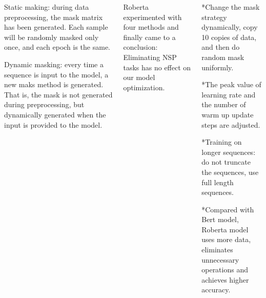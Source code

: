 \documentclass{tikzposter} %
\begin{document}
\begin{columns}
{}

{
\begin{description}

  	\item
    Static making: during data preprocessing, the mask matrix has been generated.
    Each sample will be randomly masked only once, and each epoch is the same.

    \item
    Dynamic masking: every time a sequence is input to the model,
    a new maks method is generated. That is, the mask is not generated
    during preprocessing, but dynamically generated when the input is provided
    to the model.
\end{description}
}


{
\begin{description}
  	\item
    Roberta experimented with four methods and finally came to a conclusion:
    Eliminating NSP tasks has no effect on our model optimization.
\end{description}
}

{
\begin{description}
  	
  \item
  *Change the mask strategy dynamically, copy 10 copies of data, and
  then do random mask uniformly.
  \item
  *The peak value of learning rate and the number of warm up
  update steps are adjusted.
  \item
  *Training on longer sequences: do not truncate the sequences,
  use full length sequences.
  \item
  *Compared with Bert model, Roberta model uses more data, eliminates 
  unnecessary operations and achieves higher accuracy.
\end{description}
}









\end{columns}
\end{document}
